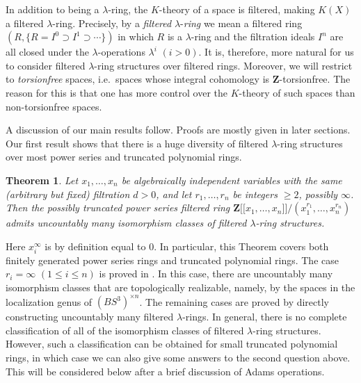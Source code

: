 \documentclass[reqno,11pt]{amsart}
\numberwithin{equation}{subsection}  %
\newtheorem{thm}[subsection]{Theorem}
\newcommand{\bZ}{\mathbf{Z}}
\begin{document}
In addition to being a $\lambda$-ring, the $K$-theory of a space is filtered, making $K(X)$ a filtered $\lambda$-ring.  Precisely, by a \emph{filtered} $\lambda$-\emph{ring} we mean a filtered ring $(R, \lbrace R=I^0 \supset I^1 \supset \cdots \rbrace)$ in which $R$ is a $\lambda$-ring and the filtration ideals $I^n$ are all closed under the $\lambda$-operations $\lambda^i$ $(i > 0)$.  It is, therefore, more natural for us to consider filtered $\lambda$-ring structures over filtered rings.   Moreover, we will restrict to \emph{torsionfree} spaces, i.e.\ spaces whose integral cohomology is $\bZ$-torsionfree.  The reason for this is that one has more control over the $K$-theory of such spaces than non-torsionfree spaces.


A discussion of our main results follow.  Proofs are mostly given in later sections.  Our first result shows that there is a huge diversity of filtered $\lambda$-ring structures over most power series and truncated polynomial rings.


\medskip
\begin{thm}
\label{thm:existence}
Let $x_1, \ldots, x_n$ be algebraically independent variables with the same (arbitrary but fixed) filtration $d > 0$, and let $r_1, \ldots, r_n$ be integers $\geq 2$, possibly $\infty$.  Then the possibly truncated power series filtered ring $\bZ \lbrack \lbrack x_1, \ldots, x_n \rbrack \rbrack/(x_1^{r_1}, \ldots, x_n^{r_n})$ admits uncountably many isomorphism classes of filtered $\lambda$-ring structures.
\end{thm}


Here $x_i^\infty$ is by definition equal to $0$.  In particular, this Theorem covers both finitely generated power series rings and truncated polynomial rings.  The case $r_i = \infty$ $(1 \leq i \leq n)$ is proved in \cite{yau2}.  In this case, there are uncountably many isomorphism classes that are topologically realizable, namely, by the spaces in the localization genus of $(BS^3)^{\times n}$.  The remaining cases are proved by directly constructing uncountably many filtered $\lambda$-rings.  In general, there is no complete classification of all of the isomorphism classes of filtered $\lambda$-ring structures.  However, such a classification can be obtained for small truncated polynomial rings, in which case we can also give some answers to the second question above.  This will be considered below after a brief discussion of Adams operations.


\end{document}
